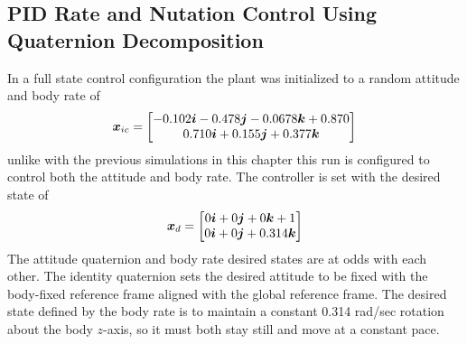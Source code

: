 \subsection{PID Rate and Nutation Control Using Quaternion Decomposition}
\label{subsec:PIDRateandNutationControl}
In a full state control configuration the plant was initialized to a random attitude and body rate of
\begin{equation}
  \boldsymbol{x}_{ic} = \begin{bmatrix} -0.102 \boldsymbol{i} -0.478 \boldsymbol{j}-0.0678 \boldsymbol{k} + 0.870 \\ 0.710 \boldsymbol{i} + 0.155 \boldsymbol{j} + 0.377 \boldsymbol{k} \end{bmatrix}
\end{equation}
unlike with the previous simulations in this chapter this run is configured to control both the attitude and body rate.  The controller is set with the desired state of
\begin{equation}
  \boldsymbol{x}_d = \begin{bmatrix} 0 \boldsymbol{i} +0 \boldsymbol{j} +0 \boldsymbol{k} + 1 \\ 0 \boldsymbol{i} + 0 \boldsymbol{j} + 0.314 \boldsymbol{k} \end{bmatrix}
\end{equation}
The attitude quaternion and body rate desired states are at odds with each other.  The identity quaternion sets the desired attitude to be fixed with the body-fixed reference frame aligned with the global reference frame.  The desired state defined by the body rate is to maintain a constant 0.314 rad/sec rotation about the body $z$-axis, so it must both stay still and move at a constant pace.

